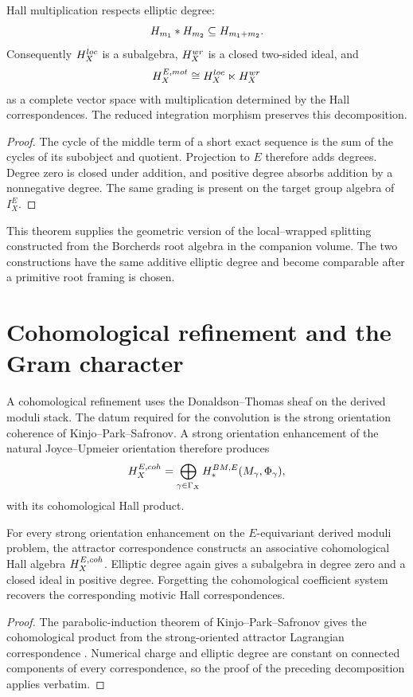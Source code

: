 \begin{theorem}
Hall multiplication respects elliptic degree:
\[
 H_{m_1}*H_{m_2}\subseteq H_{m_1+m_2}.
\]
Consequently $H_X^{loc}$ is a subalgebra, $H_X^{wr}$ is a closed two-sided ideal, and
\[
 H_X^{E,mot}
 \cong
 H_X^{loc}\ltimes H_X^{wr}
\]
as a complete vector space with multiplication determined by the Hall correspondences.  The reduced integration morphism preserves this decomposition.
\end{theorem}
\begin{proof}
The cycle of the middle term of a short exact sequence is the sum of the cycles of its subobject and quotient.  Projection to $E$ therefore adds degrees.  Degree zero is closed under addition, and positive degree absorbs addition by a nonnegative degree.  The same grading is present on the target group algebra of $I_X^E$.
\end{proof}

This theorem supplies the geometric version of the local--wrapped splitting constructed from the Borcherds root algebra in the companion volume.  The two constructions have the same additive elliptic degree and become comparable after a primitive root framing is chosen.

\chapter{Cohomological refinement and the Gram character}
A cohomological refinement uses the Donaldson--Thomas sheaf on the derived moduli stack.  The datum required for the convolution is the strong orientation coherence of Kinjo--Park--Safronov.  A strong orientation enhancement of the natural Joyce--Upmeier orientation therefore produces
\[
 H_X^{E,coh}
 =\bigoplus_{\gamma\in\Gamma_X}
 H_*^{BM,E}(M_\gamma,\Phi_\gamma),
\]
with its cohomological Hall product.

\begin{theorem}
For every strong orientation enhancement on the $E$-equivariant derived moduli problem, the attractor correspondence constructs an associative cohomological Hall algebra $H_X^{E,coh}$.  Elliptic degree again gives a subalgebra in degree zero and a closed ideal in positive degree.  Forgetting the cohomological coefficient system recovers the corresponding motivic Hall correspondences.
\end{theorem}
\begin{proof}
The parabolic-induction theorem of Kinjo--Park--Safronov gives the cohomological product from the strong-oriented attractor Lagrangian correspondence \cite{KPS}.  Numerical charge and elliptic degree are constant on connected components of every correspondence, so the proof of the preceding decomposition applies verbatim.
\end{proof}

